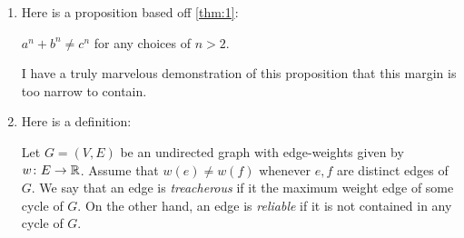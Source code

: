 \documentclass{article}
\begin{document}
\begin{enumerate}
  \item \label{qst:6}
    Here is a proposition based off \autoref{thm:1}:
    \begin{proposition}\label{prp:1}
      $a^n + b^n \neq c^n$ for any choices of $n > 2$.
    \end{proposition}
    \begin{proof*}
      I have a truly marvelous demonstration of this proposition that
      this margin is too narrow to contain.
    \end{proof*}

  \item \label{qst:7}
    Here is a definition:
    \begin{definition}
      Let $G = (V, E)$ be an undirected graph with edge-weights given
      by $w \colon E \rightarrow \operatorname*{\mathbb{R}}$. Assume that $w(e) \neq w(f)$
      whenever $e, f$ are distinct edges of $G$. We say that an edge
      is {\it treacherous} if it the maximum weight edge of some cycle
      of $G$. On the other hand, an edge is {\it reliable} if it is not
      contained in any cycle of $G$.
    \end{definition}
\end{enumerate}
\end{document}
